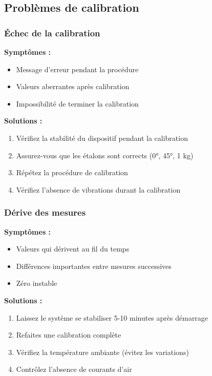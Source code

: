 \documentclass[12pt,a4paper]{article}
\begin{document}
\subsection{Problèmes de calibration}

\subsubsection{Échec de la calibration}

\textbf{Symptômes :}
\begin{itemize}
    \item Message d'erreur pendant la procédure
    \item Valeurs aberrantes après calibration
    \item Impossibilité de terminer la calibration
\end{itemize}

\textbf{Solutions :}
\begin{enumerate}
    \item Vérifiez la stabilité du dispositif pendant la calibration
    \item Assurez-vous que les étalons sont corrects (0°, 45°, 1 kg)
    \item Répétez la procédure de calibration
    \item Vérifiez l'absence de vibrations durant la calibration
\end{enumerate}

\subsubsection{Dérive des mesures}

\textbf{Symptômes :}
\begin{itemize}
    \item Valeurs qui dérivent au fil du temps
    \item Différences importantes entre mesures successives
    \item Zéro instable
\end{itemize}

\textbf{Solutions :}
\begin{enumerate}
    \item Laissez le système se stabiliser 5-10 minutes après démarrage
    \item Refaites une calibration complète
    \item Vérifiez la température ambiante (évitez les variations)
    \item Contrôlez l'absence de courants d'air
\end{enumerate}
\end{document}
